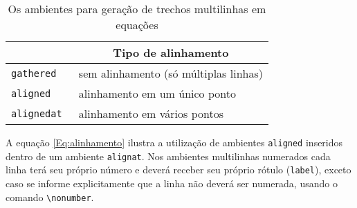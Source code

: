 
\begin{table}[htbp]
\begin{center}
\begin{tabular}{|>{\tt}l|l|} \hline
\multicolumn{1}{|c|}{PACOTE} &
\multicolumn{1}{c|}{Tipo de alinhamento}
\\ \hline
gathered & sem alinhamento (só múltiplas linhas) \\
aligned & alinhamento em um único ponto \\
alignedat & alinhamento em vários pontos
\\ \hline
\end{tabular}
\end{center}
\caption{Os ambientes para geração de trechos multilinhas em equações}
\label{Tab:submultilinhas}
\end{table}

A equação \ref{Eq:alinhamento} ilustra a utilização de ambientes
\texttt{aligned} inseridos dentro de um ambiente \texttt{alignat}.
Nos ambientes multilinhas numerados cada linha terá seu próprio número
e deverá receber seu próprio rótulo (\texttt{label}), exceto caso se
informe explicitamente que a linha não deverá ser numerada, usando o
comando \verb|\nonumber|.

